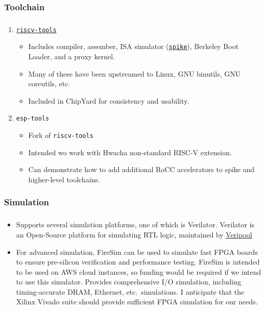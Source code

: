 \documentclass{weeklyslides}
\begin{document}
\subsubsection{Toolchain}\label{subsubsec:Toolchain} %
\begin{frame}
  \frametitle{}
  \begin{enumerate}
  \item \href{https://github.com/riscv/riscv-tools}{\texttt{riscv-tools}}
    \begin{itemize}
    \item Includes compiler, assember, ISA simulator (\href{https://github.com/riscv/riscv-isa-sim}{\texttt{spike}}), Berkeley Boot Loader, and a proxy kernel.
    \item Many of these have been upstreamed to Linux, GNU binutils, GNU coreutils, etc.
    \item Included in ChipYard for consistency and usability.
    \end{itemize}
  \item \texttt{esp-tools}
    \begin{itemize}
    \item Fork of \texttt{riscv-tools}
    \item Intended wo work with Hwacha non-standard RISC-V extension.
    \item Can demonstrate how to add additional RoCC accelerators to spike and higher-level toolchains.
    \end{itemize}
  \end{enumerate}
\end{frame}

\subsubsection{Simulation}\label{subsubsec:Simulation}
\begin{frame}
  \frametitle{}
  \begin{itemize}
  \item Supports several simulation platforms, one of which is Verilator.
    Verilator is an Open-Source platform for simulating RTL logic, maintained by \href{https://www.veripool.org/}{Veripool}
  \item For advanced simulation, FireSim can be used to simulate fast FPGA boards to ensure pre-silicon verification and performance testing.
    FireSim is intended to be used on AWS cloud instances, so funding would be required if we intend to use this simulator.
    Provides comprehensive I/O simulation, including timing-accurate DRAM, Ethernet, etc.\ simulations.
    I anticipate that the Xilinx Vivado suite should provide sufficient FPGA simulation for our needs.
  \end{itemize}
\end{frame}
\end{document}
